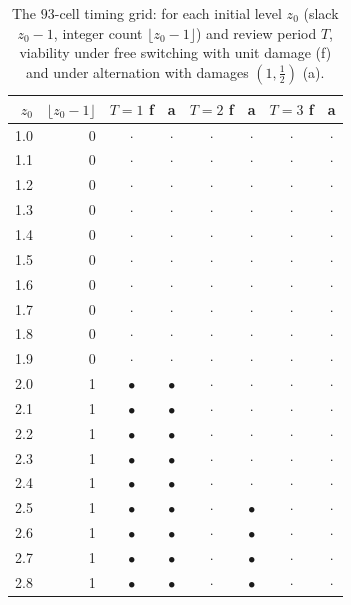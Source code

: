 \begin{table}[H]
\centering\footnotesize
\caption{The $93$-cell timing grid: for each initial level $z_0$ (slack $z_0-1$, integer count $\lfloor z_0-1\rfloor$) and review period $T$, viability under free switching with unit damage (f) and under alternation with damages $(1,\tfrac12)$ (a).}
\label{tab:timing}
\begin{tabular}{rrcccccc}
\toprule
$z_0$ & $\lfloor z_0-1\rfloor$ & $T{=}1$ f & a & $T{=}2$ f & a & $T{=}3$ f & a \\
\midrule
1.0 & 0 & $\cdot$ & $\cdot$ & $\cdot$ & $\cdot$ & $\cdot$ & $\cdot$ \\
1.1 & 0 & $\cdot$ & $\cdot$ & $\cdot$ & $\cdot$ & $\cdot$ & $\cdot$ \\
1.2 & 0 & $\cdot$ & $\cdot$ & $\cdot$ & $\cdot$ & $\cdot$ & $\cdot$ \\
1.3 & 0 & $\cdot$ & $\cdot$ & $\cdot$ & $\cdot$ & $\cdot$ & $\cdot$ \\
1.4 & 0 & $\cdot$ & $\cdot$ & $\cdot$ & $\cdot$ & $\cdot$ & $\cdot$ \\
1.5 & 0 & $\cdot$ & $\cdot$ & $\cdot$ & $\cdot$ & $\cdot$ & $\cdot$ \\
1.6 & 0 & $\cdot$ & $\cdot$ & $\cdot$ & $\cdot$ & $\cdot$ & $\cdot$ \\
1.7 & 0 & $\cdot$ & $\cdot$ & $\cdot$ & $\cdot$ & $\cdot$ & $\cdot$ \\
1.8 & 0 & $\cdot$ & $\cdot$ & $\cdot$ & $\cdot$ & $\cdot$ & $\cdot$ \\
1.9 & 0 & $\cdot$ & $\cdot$ & $\cdot$ & $\cdot$ & $\cdot$ & $\cdot$ \\
2.0 & 1 & $\bullet$ & $\bullet$ & $\cdot$ & $\cdot$ & $\cdot$ & $\cdot$ \\
2.1 & 1 & $\bullet$ & $\bullet$ & $\cdot$ & $\cdot$ & $\cdot$ & $\cdot$ \\
2.2 & 1 & $\bullet$ & $\bullet$ & $\cdot$ & $\cdot$ & $\cdot$ & $\cdot$ \\
2.3 & 1 & $\bullet$ & $\bullet$ & $\cdot$ & $\cdot$ & $\cdot$ & $\cdot$ \\
2.4 & 1 & $\bullet$ & $\bullet$ & $\cdot$ & $\cdot$ & $\cdot$ & $\cdot$ \\
2.5 & 1 & $\bullet$ & $\bullet$ & $\cdot$ & $\bullet$ & $\cdot$ & $\cdot$ \\
2.6 & 1 & $\bullet$ & $\bullet$ & $\cdot$ & $\bullet$ & $\cdot$ & $\cdot$ \\
2.7 & 1 & $\bullet$ & $\bullet$ & $\cdot$ & $\bullet$ & $\cdot$ & $\cdot$ \\
2.8 & 1 & $\bullet$ & $\bullet$ & $\cdot$ & $\bullet$ & $\cdot$ & $\cdot$ \\

\end{tabular}
\end{table}
